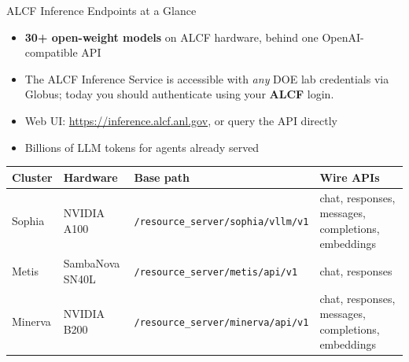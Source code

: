 \documentclass[10pt,aspectratio=169]{beamer}
\begin{document}
\begin{frame}{ALCF Inference Endpoints at a Glance}
  \begin{itemize}
    \item \textbf{30+ open-weight models} on ALCF hardware,
      behind one OpenAI-compatible API
      \pause
    \item The ALCF Inference Service is accessible with \emph{any} DOE lab
	    credentials via Globus; today you should authenticate using your
		  \textbf{ALCF} login.
      \pause
    \item Web UI: \url{https://inference.alcf.anl.gov}, or query the API
      directly
      \pause
    \item Billions of LLM tokens for agents already served
      \pause
  \end{itemize}
  \vspace{0.5em}
  \begin{table}
    \centering\footnotesize
    \begin{tabular}{@{}lll>{\raggedright\arraybackslash}p{4.1cm}@{}}
      \toprule
      Cluster & Hardware & Base path & Wire APIs \\
      \midrule
      Sophia & NVIDIA A100 & \texttt{/resource\_server/sophia/vllm/v1} & chat, responses\footnotemark, messages\footnotemark[1], completions, embeddings \\
      Metis & SambaNova SN40L & \texttt{/resource\_server/metis/api/v1} & chat, responses\footnotemark[1] \\
      Minerva & NVIDIA B200 & \texttt{/resource\_server/minerva/api/v1} & chat, responses, messages, completions, embeddings \\
      \bottomrule
    \end{tabular}
  \end{table}
\end{frame}
\end{document}

